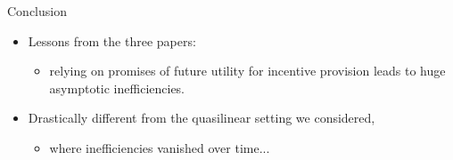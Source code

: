 \documentclass[english,10pt
,aspectratio=169
]{beamer}
\begin{document}
\begin{frame}{Conclusion}
\begin{itemize}
	\item Lessons from the three papers:
	\begin{itemize}
		\item relying on promises of future utility for incentive provision leads to huge asymptotic inefficiencies.
	\end{itemize}
	\item Drastically different from the quasilinear setting we considered,
	\begin{itemize}
		\item where inefficiencies vanished over time...
	\end{itemize}
\end{itemize}
\end{frame}
\end{document}
